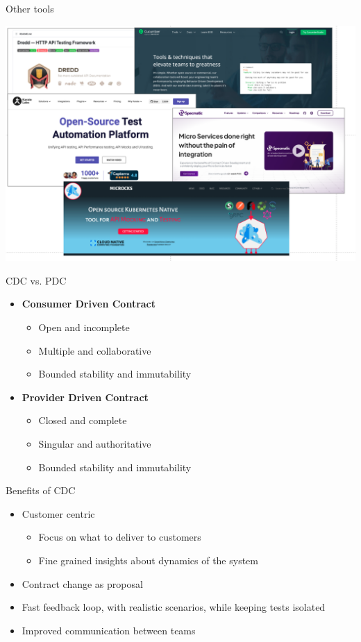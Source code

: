 

\begin{frame}{Other tools}
    \begin{center}
        \includegraphics[width=.8\textwidth]{./assets/other_tools}
    \end{center}
\end{frame}

\begin{frame}{CDC vs. PDC}
    \begin{itemize}
        \item \textbf{Consumer Driven Contract}
        \begin{itemize}
            \item Open and incomplete
            \item Multiple and collaborative
            \item Bounded stability and immutability
        \end{itemize}
        \item \textbf{Provider Driven Contract}
        \begin{itemize}
            \item Closed and complete
            \item Singular and authoritative
            \item Bounded stability and immutability
        \end{itemize}
    \end{itemize}
\end{frame}


\begin{frame}{Benefits of CDC}
    \begin{itemize}
        \item Customer centric
        \begin{itemize}
            \item Focus on what to deliver to customers
            \item Fine grained insights about dynamics of the system
        \end{itemize}
        \item Contract change as proposal
        \item Fast feedback loop, with realistic scenarios, while keeping tests isolated
        \item Improved communication between teams
    \end{itemize}

\end{frame}


